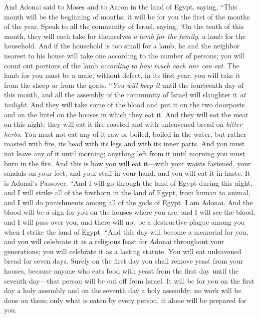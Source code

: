 \begin{biblechapter} %
 And Adonai said to Moses and to Aaron in the land of Egypt, saying,
\verse “This month will be the beginning of months; it will be for you the first of the months of the year.
\verse Speak to all the community of Israel, saying, ‘On the tenth of this month, they will each take for themselves \textit{a lamb for the family}, a lamb for the household.
\verse And if the household is too small for a lamb, he and the neighbor nearest to his house will take one according to the number of persons; you will count out portions of the lamb \textit{according to how much each one can eat}.
\verse The lamb for you must be a male, without defect, in its first year; you will take it from the sheep or from the goats.
\verse “\textit{You will keep it} until the fourteenth day of this month, and all the assembly of the community of Israel will slaughter it \textit{at twilight}.
\verse And they will take some of the blood and put it on the two doorposts and on the lintel on the houses in which they eat it.
\verse And they will eat the meat on this night; they will eat it fire-roasted and with unleavened bread on \textit{bitter herbs}.
\verse You must not eat any of it raw or boiled, boiled in the water, but rather roasted with fire, its head with its legs and with its inner parts.
\verse And you must not leave any of it until morning; anything left from it until morning you must burn in the fire.
\verse And this is how you will eat it—with your waists fastened, your sandals on your feet, and your staff in your hand, and you will eat it in haste. It is Adonai’s Passover.
\verse “And I will go through the land of Egypt during this night, and I will strike all of the firstborn in the land of Egypt, from human to animal, and I will do punishments among all of the gods of Egypt. I am Adonai.
\verse And the blood will be a sign for you on the houses where you are, and I will see the blood, and I will pass over you, and there will not be a destructive plague among you when I strike the land of Egypt.
\verse “And this day will become a memorial for you, and you will celebrate it as a religious feast for Adonai throughout your generations; you will celebrate it as a lasting statute.
\verse You will eat unleavened bread for seven days. Surely on the first day you shall remove yeast from your houses, because anyone who eats food with yeast from the first day until the seventh day—that person will be cut off from Israel.
\verse It will be for you on the first day a holy assembly and on the seventh day a holy assembly; no work will be done on them; only what is eaten by every person, it alone will be prepared for you.

\end{biblechapter}
